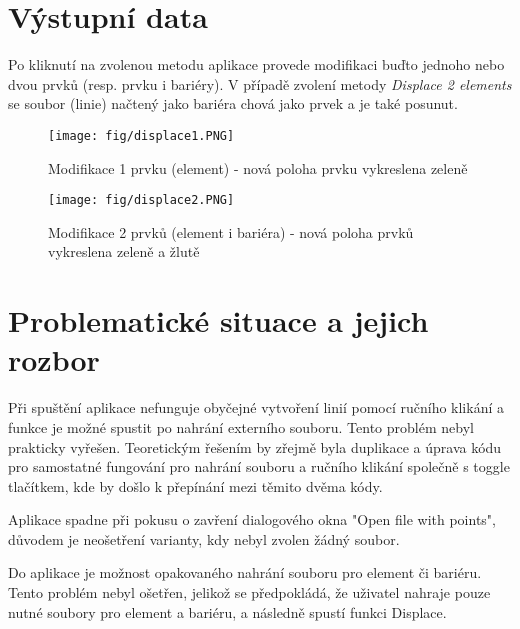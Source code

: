 \documentclass[oneside,12pt,a4paper]{book}
\begin{document}
\chapter{Výstupní data} 
Po kliknutí na zvolenou metodu aplikace provede modifikaci buďto jednoho nebo dvou prvků (resp. prvku i bariéry). V případě zvolení metody \emph{Displace 2 elements} se soubor (linie) načtený jako bariéra chová jako prvek a je také posunut. \par
\begin{figure}[ht!]
    \centering
    \texttt{[image: fig/displace1.PNG]}
    \caption{Modifikace 1 prvku (element) - nová poloha prvku vykreslena zeleně}
    \label{fig:csv}
\end{figure}
\begin{figure}[ht!]
    \centering
    \texttt{[image: fig/displace2.PNG]}
    \caption{Modifikace 2 prvků (element i bariéra) - nová poloha prvků vykreslena zeleně a žlutě}
    \label{fig:csv}
\end{figure}

\pagebreak
\chapter{Problematické situace a jejich rozbor}
Při spuštění aplikace nefunguje obyčejné vytvoření linií pomocí ručního klikání a funkce je možné spustit po nahrání externího souboru. Tento problém nebyl prakticky vyřešen. Teoretickým řešením by zřejmě byla duplikace a úprava kódu pro samostatné fungování pro nahrání souboru a ručního klikání společně s toggle tlačítkem, kde by došlo k přepínání mezi těmito dvěma kódy.\par


Aplikace spadne při pokusu o zavření dialogového okna "Open file with points", důvodem je neošetření varianty, kdy nebyl zvolen žádný soubor.\par

Do aplikace je možnost opakovaného nahrání souboru pro element či bariéru. Tento problém nebyl ošetřen, jelikož se předpokládá, že uživatel nahraje pouze nutné soubory pro element a bariéru, a následně spustí funkci Displace.\par

\pagebreak
\end{document}
